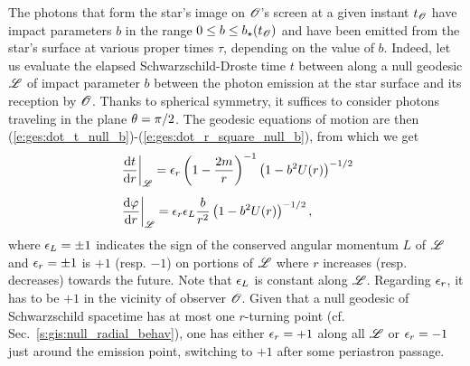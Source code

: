 The photons that form the star's image
on $\mathscr{O}$'s screen at a given instant $t_{\mathscr{O}}$ have impact parameters $b$ in
the range $0\leq b \leq b_\star(t_{\mathscr{O}})$ and have been emitted from the
star's surface at various proper times $\tau$, depending on the value of $b$.
Indeed, let us evaluate the elapsed
Schwarzschild-Droste time $t$ between
along a null geodesic $\mathscr{L}$ of impact parameter $b$ between
the photon emission at the star surface and its reception
by $\mathscr{O}$. Thanks to spherical
symmetry, it suffices to consider photons traveling in the plane
$\theta=\pi/2$. The geodesic equations of motion are then
(\ref{e:ges:dot_t_null_b})-(\ref{e:ges:dot_r_square_null_b}), from which
we get
\begin{subequations}
\begin{align}
   &\left. \frac{\mathrm{d} t}{\mathrm{d} r} \right| _{\mathscr{L}}
    = \epsilon_r \left(1 - \frac{2m}{r} \right) ^{-1}
        \left( 1 - b^2 U(r) \right) ^{-1/2}  \label{e:lem:OS:dtdr_null_geod} \\[1ex]
   &\left. \frac{\mathrm{d} \varphi}{\mathrm{d} r} \right| _{\mathscr{L}}
    = \epsilon_r \epsilon_L \frac{b}{r^2} \left( 1 - b^2 U(r) \right) ^{-1/2} ,
\end{align}
\end{subequations}
where
$\epsilon_L = \pm 1$ indicates the sign of the conserved angular momentum $L$
of $\mathscr{L}$ and $\epsilon_r = \pm 1$ is $+1$ (resp. $-1$) on portions of $\mathscr{L}$ where $r$ increases
(resp. decreases) towards the future. Note that $\epsilon_L$ is
constant along $\mathscr{L}$. Regarding $\epsilon_r$, it has to be $+1$ in the vicinity
of observer $\mathscr{O}$. Given that a null geodesic of Schwarzschild spacetime
has at most one $r$-turning point (cf. Sec.~\ref{s:gis:null_radial_behav}),
one has either $\epsilon_r = +1$ along all $\mathscr{L}$ or $\epsilon_r = -1$
just around the emission point, switching to $+1$ after some periastron
passage.

